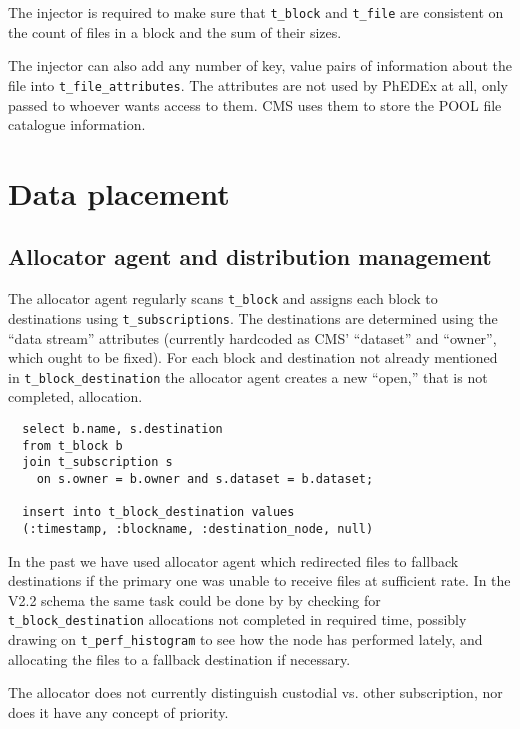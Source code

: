 \documentclass{cmspaper}
\begin{document}
The injector is required to make sure that \texttt{t\_block} and \texttt{t\_file} are consistent on the count of files in a block and the sum of their sizes.

The injector can also add any number of key, value pairs of information about the file into \texttt{t\_file\_attributes}.  The attributes are not used by PhEDEx at all, only passed to whoever wants access to them.  CMS uses them to store the POOL file catalogue information.


\section{Data placement}

\subsection{Allocator agent and distribution management}

The allocator agent regularly scans \texttt{t\_block} and assigns each block to destinations using \texttt{t\_subscriptions}.  The destinations are determined using the ``data stream'' attributes (currently hardcoded as CMS' ``dataset'' and ``owner'', which ought to be fixed).  For each block and destination not already mentioned in \texttt{t\_block\_destination} the allocator agent creates a new ``open,'' that is not completed, allocation.

{\small\begin{verbatim}
  select b.name, s.destination
  from t_block b
  join t_subscription s
    on s.owner = b.owner and s.dataset = b.dataset;

  insert into t_block_destination values
  (:timestamp, :blockname, :destination_node, null)
\end{verbatim}}

In the past we have used allocator agent which redirected files to fallback destinations if the primary one was unable to receive files at sufficient rate.  In the V2.2 schema the same task could be done by by checking for \texttt{t\_block\_destination} allocations not completed in required time, possibly drawing on \texttt{t\_perf\_histogram} to see how the node has performed lately, and allocating the files to a fallback destination if necessary.

The allocator does not currently distinguish custodial vs. other subscription, nor does it have any concept of priority.
\end{document}
